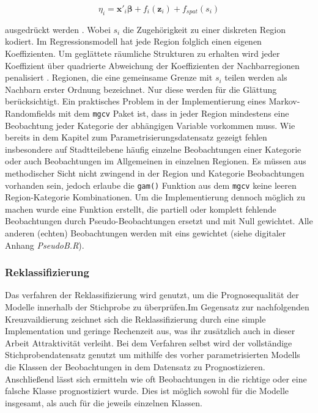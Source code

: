 \documentclass{Vorlage}
\begin{document}
\begin{equation}
\eta_{i} =\mathbf{x}'_i \boldsymbol{\beta}+f_{i}(\mathbf{z}_{i})+f_{spat}(s_i)
\end{equation}


ausgedrückt werden \cite[p. 541]{fahrmeir2013regression}. Wobei $s_i$ die Zugehörigkeit zu einer diskreten Region kodiert. Im Regressionsmodell hat jede Region folglich einen eigenen Koeffizienten. Um geglättete räumliche Strukturen zu erhalten wird jeder Koeffizient über quadrierte Abweichung der Koeffizienten der Nachbarregionen penalisiert \cite[p. 522]{fahrmeir2013regression}. Regionen, die eine gemeinsame Grenze mit $s_i$ teilen werden als Nachbarn erster Ordnung bezeichnet. Nur diese werden für die Glättung berücksichtigt.
Ein praktisches Problem in der Implementierung eines Markov-Randomfields mit dem \texttt{mgcv} Paket ist, dass in jeder Region mindestens eine Beobachtung jeder Kategorie der abhängigen Variable vorkommen muss. Wie bereits in dem Kapitel zum Parametrisierungsdatensatz gezeigt fehlen insbesondere auf Stadtteilebene häufig einzelne Beobachtungen einer Kategorie oder auch Beobachtungen im Allgemeinen in einzelnen Regionen. Es müssen aus methodischer Sicht nicht zwingend in der Region und Kategorie Beobachtungen vorhanden sein, jedoch erlaube die \texttt{gam()} Funktion aus dem \texttt{mgcv} keine leeren Region-Kategorie Kombinationen. Um die Implementierung dennoch möglich zu machen wurde eine Funktion erstellt, die partiell oder komplett fehlende Beobachtungen durch Pseudo-Beobachtungen ersetzt und mit Null gewichtet. Alle anderen (echten) Beobachtungen werden mit eins gewichtet (siehe digitaler Anhang \textit{PseudoB.R}).

\subsubsection{Reklassifizierung}

Das verfahren der Reklassifizierung wird genutzt, um die Prognosequalität der Modelle innerhalb der Stichprobe zu überprüfen.Im Gegensatz zur nachfolgenden Kreuzvaildierung zeichnet sich die Reklassifizierung durch eine simple Implementation und geringe Rechenzeit aus, was ihr zusätzlich auch in dieser Arbeit Attraktivität verleiht. Bei dem Verfahren selbst wird der vollständige Stichprobendatensatz genutzt um mithilfe des vorher parametrisierten Modells die Klassen der Beobachtungen in dem Datensatz zu Prognostizieren. Anschließend lässt sich ermitteln wie oft Beobachtungen in die richtige oder eine falsche Klasse prognostiziert wurde. Dies ist möglich sowohl für die Modelle insgesamt, als auch für die jeweils einzelnen Klassen.
\end{document}
